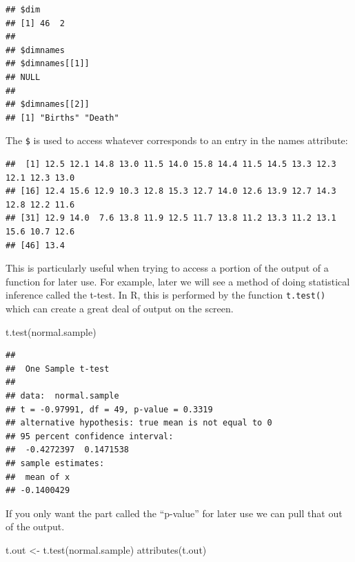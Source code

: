 \documentclass[
]{book}
\newenvironment{Shaded}{\begin{snugshade}}{\end{snugshade}}
\newcommand{\FunctionTok}[1]{\textcolor[rgb]{0.00,0.00,0.00}{#1}}
\newcommand{\NormalTok}[1]{#1}
\newcommand{\OtherTok}[1]{\textcolor[rgb]{0.56,0.35,0.01}{#1}}
\newcommand{\SpecialCharTok}[1]{\textcolor[rgb]{0.00,0.00,0.00}{#1}}
\begin{document}
\begin{verbatim}
## $dim
## [1] 46  2
## 
## $dimnames
## $dimnames[[1]]
## NULL
## 
## $dimnames[[2]]
## [1] "Births" "Death"
\end{verbatim}

The \texttt{\$} is used to access whatever corresponds to an entry in the names attribute:

\begin{Shaded}
\end{Shaded}

\begin{verbatim}
##  [1] 12.5 12.1 14.8 13.0 11.5 14.0 15.8 14.4 11.5 14.5 13.3 12.3 12.1 12.3 13.0
## [16] 12.4 15.6 12.9 10.3 12.8 15.3 12.7 14.0 12.6 13.9 12.7 14.3 12.8 12.2 11.6
## [31] 12.9 14.0  7.6 13.8 11.9 12.5 11.7 13.8 11.2 13.3 11.2 13.1 15.6 10.7 12.6
## [46] 13.4
\end{verbatim}

This is particularly useful when trying to access a portion of the output of a function for later use. For example, later we will see a method of doing statistical inference called the t-test. In R, this is performed by the function \texttt{t.test()} which can create a great deal of output on the screen.

\begin{Shaded}
\begin{Highlighting}[]
\FunctionTok{t.test}\NormalTok{(normal.sample)}
\end{Highlighting}
\end{Shaded}

\begin{verbatim}
## 
##  One Sample t-test
## 
## data:  normal.sample
## t = -0.97991, df = 49, p-value = 0.3319
## alternative hypothesis: true mean is not equal to 0
## 95 percent confidence interval:
##  -0.4272397  0.1471538
## sample estimates:
##  mean of x 
## -0.1400429
\end{verbatim}

If you only want the part called the ``p-value'' for later use we can pull that out of the output.

\begin{Shaded}
\begin{Highlighting}[]
\NormalTok{t.out }\OtherTok{\textless{}{-}} \FunctionTok{t.test}\NormalTok{(normal.sample)}
\FunctionTok{attributes}\NormalTok{(t.out)}
\end{Highlighting}
\end{Shaded}
\end{document}
